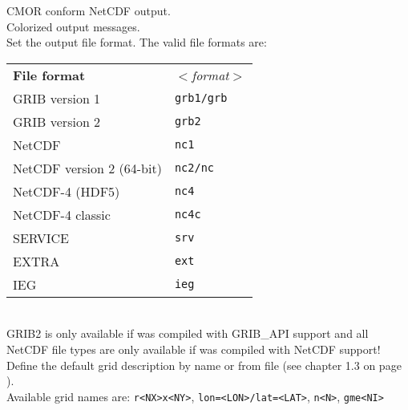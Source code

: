 \begin{tabbing}
         \> CMOR conform NetCDF output. \\
         \> Colorized output messages. \\
         \> Set the output file format. The valid file formats are: \\
         \> \parbox[r]{3in}{
              \vspace*{1mm}
              \hspace*{0cm}\begin{tabular}{|l|l|}
              \hline
              \rowcolor{pcolor2}
              {\bf File format}          & \sl $<$format$>$ \\
               GRIB version 1            & {\tt grb1/grb}  \\
               GRIB version 2            & {\tt grb2} \\
               NetCDF                    & {\tt nc1}   \\
               NetCDF version 2 (64-bit) & {\tt nc2/nc}  \\
               NetCDF-4 (HDF5)           & {\tt nc4}  \\
               NetCDF-4 classic          & {\tt nc4c} \\
               SERVICE                   & {\tt srv}  \\
               EXTRA                     & {\tt ext}  \\
               IEG                       & {\tt ieg}  \\
              \hline
              \end{tabular}
              \vspace*{1mm}
            } \\
         \> GRIB2 is only available if {\CDO} was compiled with GRIB\_API support and all \\
         \> NetCDF file types are only available if {\CDO} was compiled with NetCDF support! \\
         \> Define the default grid description by name or from file (see chapter 1.3 on page \pageref{GRID_DESCRIPTION}). \\
         \> Available grid names are: {\tt r<NX>x<NY>}, {\tt lon=<LON>/lat=<LAT>}, {\tt n<N>}, {\tt gme<NI>} \\

\end{tabbing}
